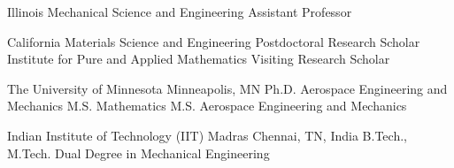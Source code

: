 \documentclass[numbers]{cv}
\begin{document}

\begin{employment}
  {Illinois}
  {
    {Mechanical Science and Engineering}
    {Assistant Professor}
    {}
    {}
  }

  {California}
  {
    {Materials Science and Engineering}
    {Postdoctoral Research Scholar}%
    {
    }
    {
    }
    {Institute for Pure and Applied Mathematics}
    {Visiting Research Scholar}
    {}
    {}
}
\end{employment}

\begin{education}
  {The University of Minnesota}%
  {Minneapolis, MN}%
  {%
    {Ph.D.}%
    {}
    {Aerospace Engineering and Mechanics}%
    {}
    {M.S.}%
    {}
    {Mathematics}%
    {%
    }%
    {M.S.}%
    {}
    {Aerospace Engineering and Mechanics}%
    {}
  }

  {Indian Institute of Technology (IIT) Madras}%
  {Chennai, TN, India}%
  {%
    {B.Tech., M.Tech.}%
    {}
    {Dual Degree in Mechanical Engineering}%
    {}
  }

\end{education}
\end{document}
